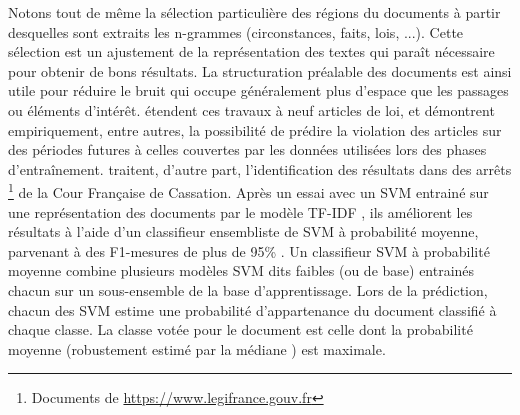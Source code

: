 Notons tout de même la sélection particulière des régions du documents à partir desquelles sont extraits les n-grammes (circonstances, faits, lois, ...). Cette sélection est un ajustement de la représentation des textes qui paraît nécessaire pour obtenir de bons résultats. La structuration préalable des documents est ainsi utile pour réduire le bruit qui occupe généralement plus d'espace que les passages ou éléments d'intérêt.  \citet{medvedeva2018echrCristalBall} étendent ces travaux à neuf articles de loi, et démontrent empiriquement, entre autres, la possibilité de prédire la violation des articles sur des périodes futures à celles couvertes par les données utilisées lors des phases d'entraînement. \cite{sulea2017legalEnsSVM} traitent, d'autre part, l'identification des résultats dans des arrêts \footnote{Documents de \url{https://www.legifrance.gouv.fr}} de la Cour Française de Cassation. Après un essai \citep{Sulea2017predictareadecision} avec un SVM entrainé sur une représentation des documents par le modèle  TF-IDF \citep{salton1988term-weighting}, ils améliorent les résultats à l'aide d'un classifieur ensembliste de SVM à probabilité moyenne,
 parvenant à des F1-mesures de plus de 95\% \cite{sulea2017legalEnsSVM}. Un classifieur SVM à probabilité moyenne combine plusieurs modèles SVM dits \og faibles \fg{} (ou de base)  entrainés chacun sur un sous-ensemble de la base d'apprentissage.
Lors de la prédiction, chacun des SVM estime une probabilité d'appartenance du document classifié à chaque classe. La classe votée pour le document est celle dont la  probabilité moyenne (robustement estimé par la médiane \citep{kittler1998combiningClassifiers}) est maximale.

